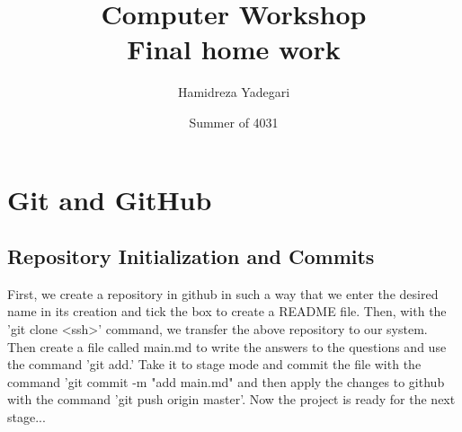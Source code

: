 \documentclass{article}
\title{Computer Workshop \\ Final home work}
\author{Hamidreza Yadegari}
\date{Summer of 4031}
\begin{document}
   \maketitle 

    \newpage
    
    \section{Git and GitHub}
        \subsection{Repository Initialization and Commits}
            First, we create a repository in github in such a way 
            that we enter the desired name in its creation and tick
             the box to create a README file. Then, with the 'git clone
              <ssh>' command, we transfer the above repository to our 
              system. Then create a file called main.md to write the 
              answers to the questions and use the command 'git add.'  
              Take it to stage mode and commit the file with the command
               'git commit -m "add main.md" and then apply the changes to 
               github with the command 'git push origin master'. Now the 
               project is ready for the next stage...

        
\end{document}
